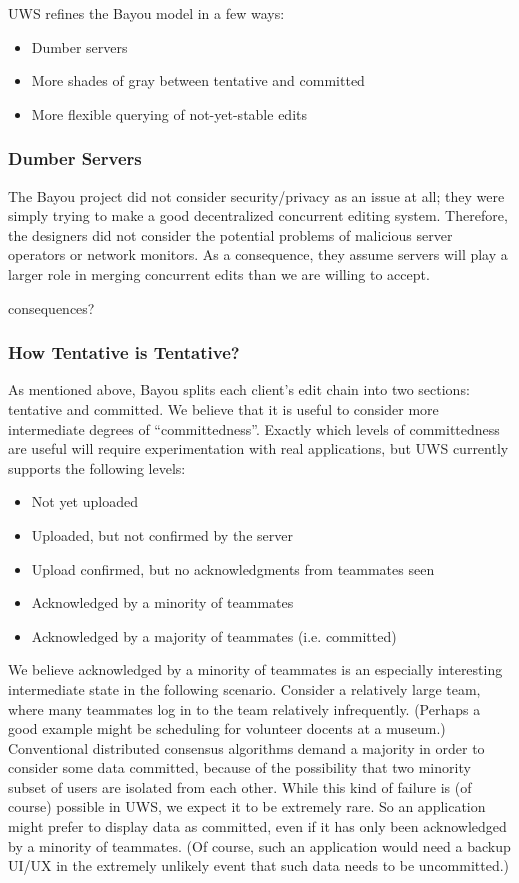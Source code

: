 \documentclass{article}
\begin{document}
UWS refines the Bayou model in a few ways:

\begin{itemize}
\item Dumber servers
\item More shades of gray between tentative and committed
\item More flexible querying of not-yet-stable edits
\end{itemize}

\subsubsection{Dumber Servers}

The Bayou project did not consider security/privacy as an issue at all; they were simply trying to make a good decentralized concurrent editing system.
Therefore, the designers did not consider the potential problems of malicious server operators or network monitors.
As a consequence, they assume servers will play a larger role in merging concurrent edits than we are willing to accept.

consequences?

\subsubsection{How Tentative is Tentative?}

As mentioned above, Bayou splits each client's edit chain into two sections: tentative and committed.
We believe that it is useful to consider more intermediate degrees of ``committedness''.
Exactly which levels of committedness are useful will require experimentation with real applications, but UWS currently supports the following levels:

\begin{itemize}
\item Not yet uploaded
\item Uploaded, but not confirmed by the server
\item Upload confirmed, but no acknowledgments from teammates seen
\item Acknowledged by a minority of teammates
\item Acknowledged by a majority of teammates (i.e. committed)
\end{itemize}

We believe acknowledged by a minority of teammates is an especially interesting intermediate state in the following scenario.
Consider a relatively large team, where many teammates log in to the team relatively infrequently.
(Perhaps a good example might be scheduling for volunteer docents at a museum.)
Conventional distributed consensus algorithms demand a majority in order to consider some data committed, because of the possibility that two minority subset of users are isolated from each other.
While this kind of failure is (of course) possible in UWS, we expect it to be extremely rare.
So an application might prefer to display data as committed, even if it has only been acknowledged by a minority of teammates.
(Of course, such an application would need a backup UI/UX in the extremely unlikely event that such data needs to be uncommitted.)
\end{document}
